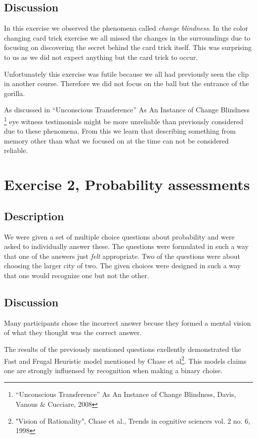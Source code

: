 \documentclass[10pt, a4paper]{article}
\begin{document}
\subsection{Discussion}
In this exercise we observed the phenomena called \emph{change blindness}. In the color changing card trick exercise we all missed the changes in the surroundings due to focusing on discovering the secret behind the card trick itself. This was surprising to us as we did not expect anything but the card trick to occur. 

Unfortunately this exercise was futile because we all had previously seen the clip in another course. Therefore we did not focus on the ball but the entrance of the gorilla. 

As discussed in “Unconscious Transference” As An Instance of Change Blindness \footnote{“Unconscious Transference” As An Instance of Change Blindness, Davis, Vanous \& Cucciare, 2008} eye witness testimonials might be more unreliable than previously considered due to these phenomena. From this we learn that describing something from memory other than what we focused on at the time can not be considered reliable. 

\section{Exercise 2, Probability assessments}
\subsection{Description}
We were given a set of multiple choice questions about probability and were asked to individually answer these. 
The questions were formulated in such a way that one of the answers just \emph{felt} appropriate.
Two of the questions were about choosing the larger city of two. The given choices were designed in such a way that one would recognize one but not the other. 

\subsection{Discussion}
Many participants chose the incorrect answer becuse they formed a mental vision of what they thought was the correct answer. 

The results of the previously mentioned questions exellently demonstrated the Fast and Frugal Heuristic model mentioned by Chase et al\footnote{"Vision of Rationality", Chase et al., Trends in cognitive sciences vol. 2 no. 6, 1998}. This models claims one are strongly influensed by recognition when making a binary choise. 
\end{document}
